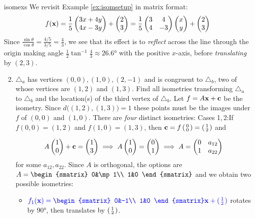 \begin{examples}{}{isomexs}
\exstart We revisit Example \ref{ex:isomsetup} in matrix format:
\[f({\mathbf{x}})=\frac 15\begin{pmatrix}3x+4y\\4x-3y\end{pmatrix}+\begin{pmatrix}2\\3\end{pmatrix}
=\frac 15\begin{pmatrix}
3&4\\
4&-3
\end{pmatrix}
\begin{pmatrix}x\\y\end{pmatrix}
+\begin{pmatrix}2\\3\end{pmatrix}\]
Since $\frac{\sin\theta}{\cos\theta}=\frac{4/5}{3/5}=\frac 43$, we see that its effect is to \emph{reflect} across the line through the origin making angle $\frac 12\tan^{-1}\frac 43\approx \ang{26.6}$ with the positive $x$-axis, before \emph{translating} by $(2,3)$.

\begin{enumerate}\setcounter{enumi}{1}
	\item\label{ex:isomexs2} $\triangle_a$ has vertices $(0,0),(1,0),(2,-1)$ and is congruent to $\triangle_b$, two of whose vertices are $(1,2)$ and $(1,3)$. Find all isometries transforming $\triangle_a$ to $\triangle_b$ and the location(s) of the third vertex of $\triangle_b$.\smallbreak
Let $f=A{\mathbf{x}}+{\mathbf{c}}$ be the isometry. Since $d\bigl((1,2),(1,3)\bigr)=1$ these points must be the images under $f$ of $(0,0)$ and $(1,0)$. There are \emph{four} distinct isometries:
\smallbreak
Cases 1,\,2:\lstsp If $f(0,0)=(1,2)$ and $f(1,0)=(1,3)$, then ${\mathbf{c}}=f\left(\begin{smallmatrix}0\\0\end{smallmatrix}\right)=\left(\begin{smallmatrix}1\\2\end{smallmatrix}\right)$ and\par
  \begin{minipage}[t]{0.75\linewidth}\vspace{-10pt}
  \begin{gather*}
  A\begin{pmatrix}1\\0\end{pmatrix}+{\mathbf{c}}=\begin{pmatrix}1\\3\end{pmatrix}\implies A\begin{pmatrix}1\\0\end{pmatrix}=\begin{pmatrix}0\\1\end{pmatrix}   \implies A=\begin{pmatrix}
  0&a_{12}\\
  1&a_{22}
  \end{pmatrix}
  \end{gather*}
  for some $a_{12},a_{22}$. Since $A$ is orthogonal, the options are $A=\begin{smatrix}
  0&\mp 1\\
  1&0
  \end{smatrix}$ and we obtain two possible isometries:
  \begin{itemize}
    \item  $\textcolor{blue}{f_1(\vx)=\begin{smatrix}
  		0&-1\\
  		1&0
    \end{smatrix}\vx+\stwovec 12}$ rotates by \ang{90}, then translates by $\left(\begin{smallmatrix}1\\2\end{smallmatrix}\right)$.

\end{itemize}
\end{minipage}
\end{enumerate}
\end{examples}
